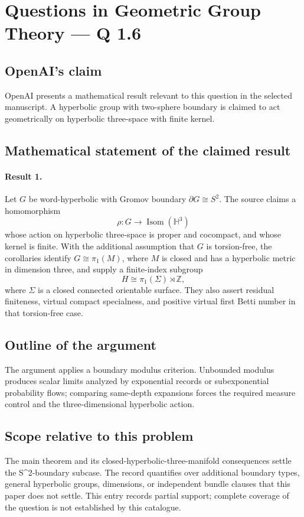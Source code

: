 \documentclass[11pt]{article}
\begin{document}
\section*{Questions in Geometric Group Theory — Q 1.6}

\subsection{OpenAI's claim}
OpenAI presents a mathematical result relevant to this question in the selected manuscript. A hyperbolic group with two-sphere boundary is claimed to act geometrically on hyperbolic three-space with finite kernel.

\subsection{Mathematical statement of the claimed result}
\paragraph{Result 1.} Let \(G\) be word-hyperbolic with Gromov boundary \(\partial G\cong S^2\). The source claims a homomorphism
\[
 \rho:G\longrightarrow\operatorname{Isom}(\mathbb H^3)
\]
whose action on hyperbolic three-space is proper and cocompact, and whose kernel is finite. With the additional assumption that \(G\) is torsion-free, the corollaries identify \(G\cong\pi_1(M)\), where \(M\) is closed and has a hyperbolic metric in dimension three, and supply a finite-index subgroup
\[
 H\cong\pi_1(\Sigma)\rtimes\mathbb Z,
\]
where \(\Sigma\) is a closed connected orientable surface. They also assert residual finiteness, virtual compact specialness, and positive virtual first Betti number in that torsion-free case.

\subsection{Outline of the argument}
The argument applies a boundary modulus criterion. Unbounded modulus produces scalar limits analyzed by exponential records or subexponential probability flows; comparing same-depth expansions forces the required measure control and the three-dimensional hyperbolic action.

\subsection{Scope relative to this problem}
The main theorem and its closed-hyperbolic-three-manifold consequences settle the S\textasciicircum{}2-boundary subcase. The record quantifies over additional boundary types, general hyperbolic groups, dimensions, or independent bundle clauses that this paper does not settle. This entry records partial support; complete coverage of the question is not established by this catalogue.
\end{document}
